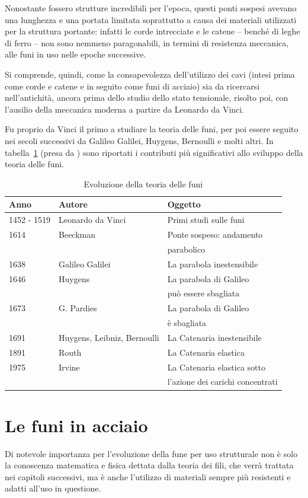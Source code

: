 Nonostante fossero strutture incredibili per l'epoca, questi ponti sospesi avevano una lunghezza e una portata limitata soprattutto a causa dei materiali utilizzati per la struttura portante: infatti le corde intrecciate e le catene -- benché di leghe di ferro -- non sono nemmeno paragonabili, in termini di resistenza meccanica, alle funi in uso nelle epoche successive.

Si comprende, quindi, come la consapevolezza dell'utilizzo dei cavi (intesi prima come corde e catene e in seguito come funi di acciaio)
sia da ricercarsi nell'antichità, ancora prima dello studio dello stato tensionale, risolto poi, con l'ausilio della meccanica moderna a partire da Leonardo da Vinci. 

Fu proprio da Vinci il primo a studiare la teoria delle funi, per poi essere seguito nei secoli successivi da Galileo Galilei, Huygens, Bernoulli e molti altri.
In tabella~\ref{tab:th_funi} (presa da \cite{landrini:storia}) sono riportati i contributi più significativi allo sviluppo della teoria delle funi.


\begin{table}
	\centering
	\caption{Evoluzione della teoria delle funi}
	\label{tab:th_funi}
	\begin{tabular}{p{1cm}p{3.5cm}p{5.5cm}}
		\toprule
		Anno &Autore &Oggetto\\
		\midrule
		1452 - 1519 & Leonardo da Vinci & Primi studi sulle funi\\
		1614 & Beeckman & Ponte sospeso: andamento\\&& parabolico\\
		1638 &Galileo Galilei &La parabola inestensibile\\
		1646 &Huygens &La parabola di Galileo\\&& può essere sbagliata\\
		1673 &G. Pardies &La parabola di Galileo\\&& è sbagliata\\
		1691 &Huygens, Leibniz, Bernoulli &La Catenaria inestensibile\\
		1891 &Routh &La Catenaria elastica\\
		1975 &Irvine &La Catenaria elastica sotto\\&& l'azione dei carichi concentrati	\\	
		\bottomrule
	\end{tabular}
\end{table}
%
%
%
\section{Le funi in acciaio}
Di notevole importanza per l'evoluzione della fune per uso strutturale non è solo la conoscenza matematica e fisica dettata dalla teoria dei fili, che verrà trattata nei capitoli successivi, ma è anche l'utilizzo di materiali sempre più resistenti e adatti all'uso in questione.

